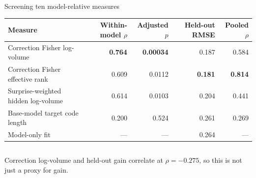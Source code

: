 \documentclass[aspectratio=169,10pt]{beamer}
\begin{document}
\begin{frame}{Screening ten model-relative measures}
\begin{center}\small
\setlength{\tabcolsep}{6pt}
\begin{tabular}{lrrrr}
\toprule
Measure & Within-model $\rho$ & Adjusted $p$ & Held-out RMSE & Pooled $\rho$\\
\midrule
Correction Fisher log-volume & \textbf{0.764} & \textbf{0.00034} & 0.187 & 0.584\\
Correction Fisher effective rank & 0.609 & 0.0112 & \textbf{0.181} & \textbf{0.814}\\
Surprise-weighted hidden log-volume & 0.614 & 0.0103 & 0.204 & 0.441\\
Base-model target code length & 0.200 & 0.524 & 0.261 & 0.269\\
Model-only fit & --- & --- & 0.264 & ---\\
\bottomrule
\end{tabular}
\end{center}
\vspace{0.25cm}
\begin{columns}[T,onlytextwidth]
\small Correction log-volume and held-out gain correlate at $\rho=-0.275$, so this is not just a proxy for gain.
\end{columns}
\end{frame}
\end{document}
